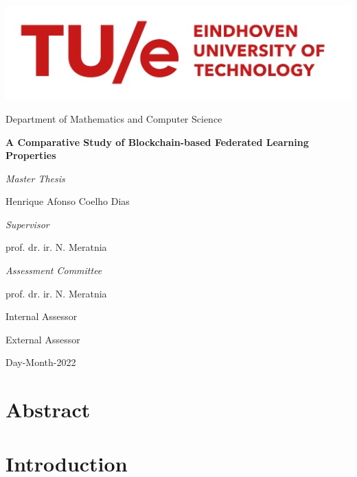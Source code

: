\documentclass[12pt,a4paper,oneside]{book}
\begin{document}

\begin{titlepage}
\centering
\includegraphics[width=0.7\linewidth]{graphics/tue-logo.png}\par
Department of Mathematics and Computer Science

\vspace{3cm}
{\LARGE\textbf{A Comparative Study of Blockchain-based Federated Learning Properties}}\par\vspace{0.5cm}
{\large\textit{Master Thesis}}\par\vspace{1cm}
{\large Henrique Afonso Coelho Dias}\par

\vfill

\emph{Supervisor}\par
prof. dr. ir. N. Meratnia\par

\vspace{2cm}

\emph{Assessment Committee}\par
prof. dr. ir. N. Meratnia\par
Internal Assessor\par
External Assessor\par

\vspace{2cm}

{Day-Month-2022}

\end{titlepage}

\chapter*{Abstract}\label{chapter:abstract}


\tableofcontents

\listoffigures

\listoftables

\chapter{Introduction}\label{chapter:introduction}

\end{document}
